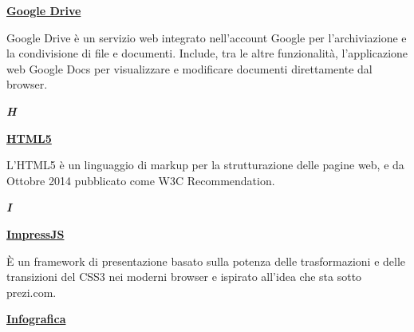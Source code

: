 \bigskip
\begin{addmargin}[0em]{0em}
	\textbf{\underline{Google Drive}}
\end{addmargin}

\medskip
\begin{addmargin}[5em]{1em}	
Google Drive è un servizio web integrato nell'account Google per l'archiviazione e la condivisione di file e documenti.
Include, tra le altre funzionalità,  l'applicazione web Google Docs per visualizzare e modificare documenti direttamente 
dal browser.	
\end{addmargin}	

\newpage

\cleardoublepage
{}
{}
\noindent\hrulefill\hspace{4mm}\textbf{\textsl{\Huge{H}}}\hspace{4mm}\hrulefill

\vspace*{2\bigskipamount}

\begin{addmargin}[0em]{0em}	
	\textbf{\underline{HTML5}}
\end{addmargin}

\medskip
\begin{addmargin}[5em]{1em}	
L'HTML5 è un linguaggio di markup per la strutturazione delle pagine web, e da Ottobre 2014 pubblicato come W3C Recommendation.
\end{addmargin}	

\newpage

\cleardoublepage
{}
{}
\noindent\hrulefill\hspace{4mm}\textbf{\textsl{\Huge{I}}}\hspace{4mm}\hrulefill

\vspace*{2\bigskipamount}

\begin{addmargin}[0em]{0em}	
	\textbf{\underline{ImpressJS}}
\end{addmargin}

\medskip
\begin{addmargin}[5em]{1em}	
	È un framework di presentazione basato sulla potenza delle trasformazioni e delle transizioni del CSS3 nei moderni browser e ispirato all'idea che sta sotto prezi.com.
\end{addmargin}	

\bigskip
\begin{addmargin}[0em]{0em}	
	\textbf{\underline{Infografica}}
\end{addmargin}

